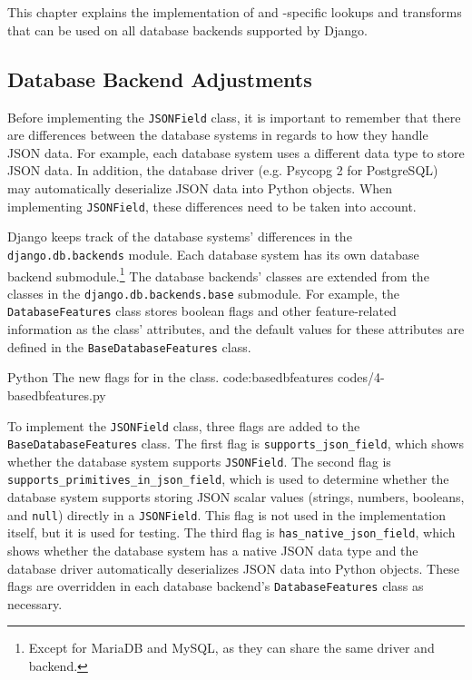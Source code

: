 \chapter{\babEmpat}

This chapter explains the implementation of  and
-specific lookups and transforms that can be used on all
database backends supported by Django.

\section{Database Backend Adjustments}

Before implementing the \verb|JSONField| class, it is important to remember
that there are differences between the database systems in regards to how they
handle JSON data. For example, each database system uses a different data type
to store JSON data. In addition, the database driver (e.g. Psycopg 2 for
PostgreSQL) may automatically deserialize JSON data into Python objects. When
implementing \verb|JSONField|, these differences need to be taken into account.

Django keeps track of the database systems' differences in the
\verb|django.db.backends| module. Each database system has its own database
backend submodule.\footnote{Except for MariaDB and MySQL, as they can share the
same driver and backend.} The database backends' classes are extended from the
classes in the \verb|django.db.backends.base| submodule. For example, the
\verb|DatabaseFeatures| class stores boolean flags and other feature-related
information as the class' attributes, and the default values for these
attributes are defined in the \verb|BaseDatabaseFeatures| class.

\listing
{Python}
{The new flags for  in the  class.}
{code:basedbfeatures}
{codes/4-basedbfeatures.py}

To implement the \verb|JSONField| class, three flags are added to the
\verb|BaseDatabaseFeatures| class. The first flag is
\verb|supports_json_field|, which shows whether the database system supports
\verb|JSONField|. The second flag is \verb|supports_primitives_in_json_field|,
which is used to determine whether the database system supports storing JSON
scalar values (strings, numbers, booleans, and \verb|null|) directly in a
\verb|JSONField|. This flag is not used in the  implementation
itself, but it is used for testing. The third flag is
\verb|has_native_json_field|, which shows whether the database system has a
native JSON data type and the database driver automatically deserializes JSON
data into Python objects. These flags are overridden in each database backend's
\verb|DatabaseFeatures| class as necessary.

